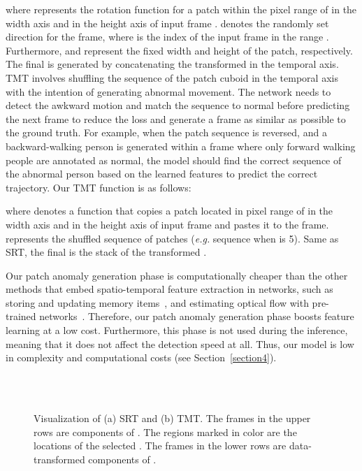 \documentclass[10pt,twocolumn,letterpaper]{article}
\begin{document}
where  represents the rotation function for a patch within the pixel range of  in the width axis and  in the height axis of input frame .  denotes the randomly set direction for the  frame, where  is the index of the input frame in the range . Furthermore,  and  represent the fixed width and height of the patch, respectively. The final  is generated by concatenating the transformed  in the temporal axis. \\
\indent TMT involves shuffling the sequence of the patch cuboid  in the temporal axis with the intention of generating abnormal movement. The network needs to detect the awkward motion and match the sequence to normal before predicting the next frame to reduce the loss and generate a frame as similar as possible to the ground truth. For example, when the patch sequence is reversed, and a backward-walking person is generated within a frame where only forward walking people are annotated as normal, the model should find the correct sequence of the abnormal person based on the learned features to predict the correct trajectory. Our TMT function is as follows:

where  denotes a function that copies a patch located in pixel range of  in the width axis and  in the height axis of input frame  and pastes it to the  frame.   represents the shuffled sequence of  patches ({\it e.g.} sequence  when  is 5). Same as SRT, the final  is the stack of the transformed .

\indent Our patch anomaly generation phase is computationally cheaper than the other methods that embed spatio-temporal feature extraction in networks, such as storing and updating memory items~\cite{gong2019memorizing, park2020learning}, and estimating optical flow with pre-trained networks~\cite{Liu_2018_CVPR, ravanbakhsh2017abnormal, yu2020cloze, cai2021appearance}. Therefore, our patch anomaly generation phase boosts feature learning at a low cost. Furthermore, this phase is not used during the inference, meaning that it does not affect the detection speed at all. Thus, our model is low in complexity and computational costs (see Section~\ref{section4}).


\begin{figure}[t]
	\centering
	\\
	\vspace{-0.8em}
	\\
	\vspace{0.5em}
	\caption{Visualization of (a) SRT and (b) TMT. The frames in the upper rows are components of . The regions marked in color are the locations of the selected . The frames in the lower rows are data-transformed components of .}
	\label{trainSRT}
\end{figure}
\end{document}
